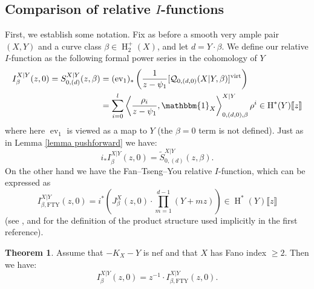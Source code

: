 \documentclass[10pt]{amsart}
\newcommand{\Q}[4]{\mathcal{Q}_{#1,#2}(#3,#4)}
\newcommand{\virt}[1]{[#1]^{\operatorname{virt}}}
\newcommand{\HH}{\operatorname{H}}
\newcommand{\ev}{\operatorname{ev}}
\theoremstyle{definition}
\newtheorem{thm}{Theorem}[section]
\theoremstyle{definition}
\begin{document}
\subsection{Comparison of relative $I$-functions} First, we establish some notation. Fix as before a smooth very ample pair $(X,Y)$ and a curve class $\beta \in \HH_2^+(X)$, and let $d=Y\cdot \beta$. We define our relative $I$-function as the following formal power series in the cohomology of $Y$
\begin{align*} I^{X|Y}_\beta(z,0) = S_{0,(d)}^{X|Y}(z,\beta) & = (\ev_1)_*\left( \frac{1}{z-\psi_1}\virt{\Q{0}{(d,0)}{X|Y}{\beta}}\right) \\
& = \sum_{i=0}^l \left\langle \dfrac{\rho_i}{z- \psi_1}, \mathbbm{1}_X \right\rangle^{X|Y}_{0,(d,0),\beta} \rho^i \in \HH^*(Y)\llbracket z \rrbracket \end{align*}
where here $\ev_1$ is viewed as a map to $Y$ (the $\beta=0$ term is not defined). Just as in Lemma \ref{lemma pushforward} we have:
\begin{equation*} i_* I_\beta^{X|Y}(z,0) = \widetilde{S}_{0,(d)}^{X|Y}(z,\beta).\end{equation*}
On the other hand we have the Fan--Tseng--You relative $I$-function, which can be expressed as
\begin{equation*} I_{\beta,\mathrm{FTY}}^{X|Y}(z,0) = i^* \left( J^X_{\beta}(z,0) \cdot \prod_{m=1}^{d-1}(Y+mz) \right) \in \HH^*(Y)\llbracket z \rrbracket\end{equation*}
(see \cite[Theorem 4.3]{FanTsengYou}, and \cite[\S 7.1]{FanWuYou} for the definition of the product structure used implicitly in the first reference).
\begin{thm} \label{wallcrossing thm} Assume that $-K_X-Y$ is nef and that $X$ has Fano index $\geq 2$. Then we have:
\begin{equation*} I_\beta^{X|Y}(z,0) = z^{-1}\cdot I_{\beta,\mathrm{FTY}}^{X|Y}(z,0).\end{equation*}
\end{thm}
\end{document}
